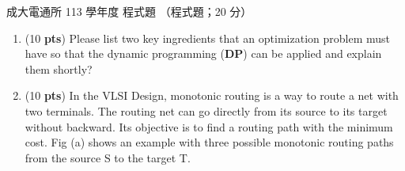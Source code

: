 \begin{pastexam}[label={px:ncku-113-cce-19}]{成大電通所 113 學年度 程式題}
（程式題；20 分）

\begin{enumerate}[label=\alph*.]
\item (10 \textbf{pts}) Please list two key ingredients that an optimization problem must have so
that the dynamic programming (\textbf{DP}) can be applied and explain them shortly?

\item (10 \textbf{pts}) In the VLSI Design, monotonic routing is a way to route a net with two
terminals. The routing net can go directly from its source to its target without backward. Its
objective is to find a routing path with the minimum cost. Fig (a) shows an example with three
possible monotonic routing paths from the source S to the target T.


\end{enumerate}
\end{pastexam}
